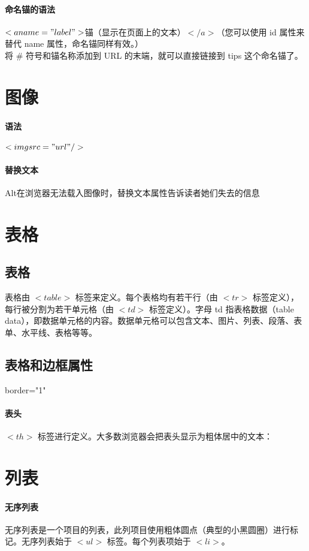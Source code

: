 \documentclass[10pt,UTF8]{ctexart}
\begin{document}
\paragraph{命名锚的语法} $<a name="label">$锚（显示在页面上的文本）$</a>$（您可以使用 id 属性来替代 name 属性，命名锚同样有效。）\\
将 \# 符号和锚名称添加到 URL 的末端，就可以直接链接到 tips 这个命名锚了。

\section{图像}
\paragraph{语法}$<img src="url" />$
\paragraph{替换文本}Alt在浏览器无法载入图像时，替换文本属性告诉读者她们失去的信息

\section{表格}
\subsection{表格}
表格由 $<table>$ 标签来定义。每个表格均有若干行（由 $<tr>$ 标签定义），每行被分割为若干单元格（由 $<td>$ 标签定义）。字母 td 指表格数据（table data），即数据单元格的内容。数据单元格可以包含文本、图片、列表、段落、表单、水平线、表格等等。
\subsection{表格和边框属性}
border="1"
\paragraph{表头}$<th>$ 标签进行定义。大多数浏览器会把表头显示为粗体居中的文本：

\section{列表}
\paragraph{无序列表} 无序列表是一个项目的列表，此列项目使用粗体圆点（典型的小黑圆圈）进行标记。无序列表始于 $<ul>$ 标签。每个列表项始于 $<li>$。
\end{document}
